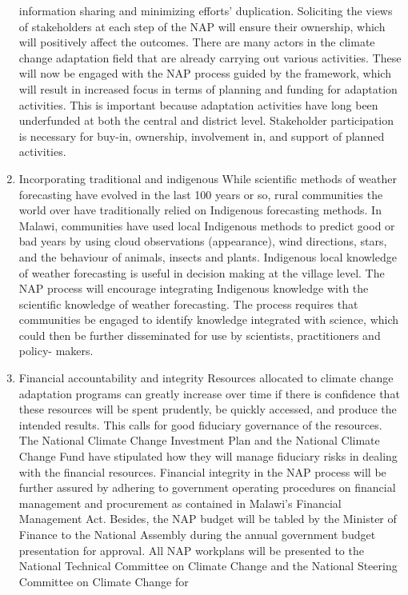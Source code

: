 \documentclass[
]{book}
\begin{document}
\begin{enumerate}
  information sharing and minimizing efforts' duplication. Soliciting the views of stakeholders at each step of the NAP will ensure their ownership, which will
  positively affect the outcomes. There are many actors in the climate change adaptation field that are already carrying out various activities. These will now be
  engaged with the NAP process guided by the framework, which will result in increased focus in terms of planning and funding for adaptation activities. This is
  important because adaptation activities have long been underfunded at both the central and district level. Stakeholder participation is necessary for buy-in,
  ownership, involvement in, and support of planned activities.
\item
  Incorporating traditional and indigenous
  While scientific methods of weather forecasting have evolved in the last 100 years or so, rural communities the world over have traditionally relied on
  Indigenous forecasting methods. In Malawi, communities have used local Indigenous methods to predict good or bad years by using cloud observations (appearance),
  wind directions, stars, and the behaviour of animals, insects and plants. Indigenous local knowledge of weather forecasting is useful in decision making at the
  village level. The NAP process will encourage integrating Indigenous knowledge with the scientific knowledge of weather forecasting. The process requires that
  communities be engaged to identify knowledge integrated with science, which could then be further disseminated for use by scientists, practitioners and policy-
  makers.
\item
  Financial accountability and integrity
  Resources allocated to climate change adaptation programs can greatly increase over time if there is confidence that these resources will be spent prudently, be
  quickly accessed, and produce the intended results. This calls for good fiduciary governance of the resources. The National Climate Change Investment Plan and
  the National Climate Change Fund have stipulated how they will manage fiduciary risks in dealing with the financial resources. Financial integrity in the NAP
  process will be further assured by adhering to government operating procedures on financial management and procurement as contained in Malawi's Financial
  Management Act. Besides, the NAP budget will be tabled by the Minister of Finance to the National Assembly during the annual government budget presentation for
  approval. All NAP workplans will be presented to the National Technical Committee on Climate Change and the National Steering Committee on Climate Change for

\end{enumerate}
\end{document}
